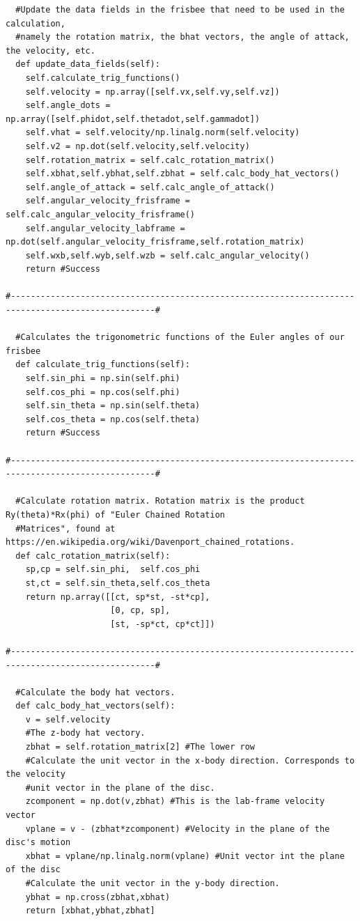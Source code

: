 \documentclass[a4paper,12pt, oneside]{article}
\begin{document}
\begin{verbatim}
  #Update the data fields in the frisbee that need to be used in the calculation,
  #namely the rotation matrix, the bhat vectors, the angle of attack, the velocity, etc.
  def update_data_fields(self):
    self.calculate_trig_functions()
    self.velocity = np.array([self.vx,self.vy,self.vz])
    self.angle_dots = np.array([self.phidot,self.thetadot,self.gammadot])
    self.vhat = self.velocity/np.linalg.norm(self.velocity)
    self.v2 = np.dot(self.velocity,self.velocity)
    self.rotation_matrix = self.calc_rotation_matrix()
    self.xbhat,self.ybhat,self.zbhat = self.calc_body_hat_vectors()
    self.angle_of_attack = self.calc_angle_of_attack()
    self.angular_velocity_frisframe = self.calc_angular_velocity_frisframe()
    self.angular_velocity_labframe = np.dot(self.angular_velocity_frisframe,self.rotation_matrix)
    self.wxb,self.wyb,self.wzb = self.calc_angular_velocity()
    return #Success

#---------------------------------------------------------------------------------------------------#

  #Calculates the trigonometric functions of the Euler angles of our frisbee
  def calculate_trig_functions(self):
    self.sin_phi = np.sin(self.phi)
    self.cos_phi = np.cos(self.phi)
    self.sin_theta = np.sin(self.theta)
    self.cos_theta = np.cos(self.theta)
    return #Success

#---------------------------------------------------------------------------------------------------#

  #Calculate rotation matrix. Rotation matrix is the product Ry(theta)*Rx(phi) of "Euler Chained Rotation
  #Matrices", found at https://en.wikipedia.org/wiki/Davenport_chained_rotations. 
  def calc_rotation_matrix(self):
    sp,cp = self.sin_phi,  self.cos_phi
    st,ct = self.sin_theta,self.cos_theta
    return np.array([[ct, sp*st, -st*cp],
                     [0, cp, sp],
                     [st, -sp*ct, cp*ct]])

#---------------------------------------------------------------------------------------------------#

  #Calculate the body hat vectors.
  def calc_body_hat_vectors(self):
    v = self.velocity
    #The z-body hat vectory.
    zbhat = self.rotation_matrix[2] #The lower row
    #Calculate the unit vector in the x-body direction. Corresponds to the velocity
    #unit vector in the plane of the disc.
    zcomponent = np.dot(v,zbhat) #This is the lab-frame velocity vector
    vplane = v - (zbhat*zcomponent) #Velocity in the plane of the disc's motion
    xbhat = vplane/np.linalg.norm(vplane) #Unit vector int the plane of the disc
    #Calculate the unit vector in the y-body direction.
    ybhat = np.cross(zbhat,xbhat)
    return [xbhat,ybhat,zbhat]


\end{verbatim}
\end{document}
